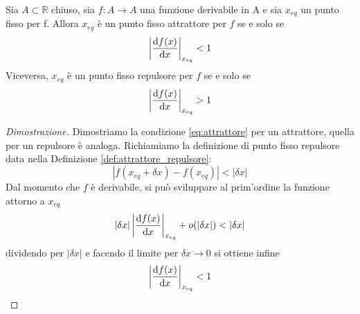 \begin{teorema}
Sia $A\subset \mathbb{R}$ chiuso, sia $f : A \rightarrow A$ una funzione derivabile in A e sia $x_{eq}$ un punto fisso per f. Allora $x_{eq}$ è un punto fisso attrattore per $f$ se e solo se 
\begin{equation}
    \left| \dfrac{\dif f(x)}{\dif x}\right| _{x_{eq}} < 1
    \label{eq:attrattore}
\end{equation}
Viceversa, $x_{eq}$ è un punto fisso repulsore per $f$ se e solo se
\begin{equation}
    \left| \dfrac{\dif f(x)}{\dif x}\right| _{x_{eq}} > 1
    \label{eq:repulsore}
\end{equation}
\label{teorema}
\end{teorema}
\begin{proof}[Dimostrazione]
    
    Dimostriamo la condizione \ref{eq:attrattore} per un attrattore, quella per un repulsore è analoga. Richiamiamo la definizione di punto fisso repulsore data nella Definizione \ref{def:attrattore_repulsore}:
    $$|f(x_{eq} + \delta x) - f(x_{eq})| < |\delta x|$$
    Dal momento che $f$ è derivabile, si può sviluppare al prim'ordine la funzione attorno a $x_{eq}$
    $$ |\delta x| \left| \dfrac{\dif f(x)}{\dif x} \right|_{x_{eq}} + o(|\delta x|) < |\delta x|$$
     dividendo per $|\delta x|$ e facendo il limite per $\delta x \rightarrow 0$ si ottiene infine
    $$ \left| \dfrac{\dif f(x)}{\dif x}\right| _{x_{eq}} < 1$$
\end{proof}